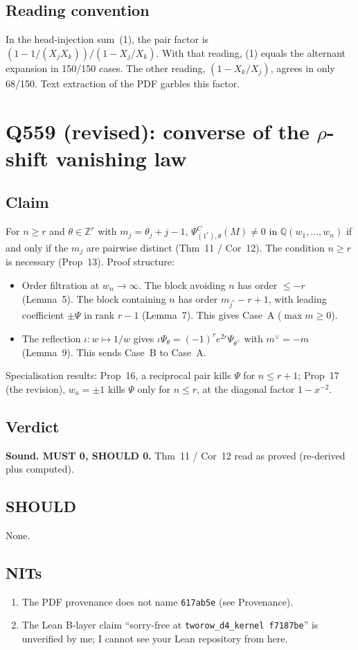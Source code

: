 \documentclass[11pt]{amsart}
\newcommand{\PsiC}{\Psi^{C}}
\newcommand{\Q}{\mathbb{Q}}
\newcommand{\Z}{\mathbb{Z}}
\begin{document}
\subsection*{Reading convention}
In the head-injection sum~(1), the pair factor is
$(1 - 1/(X_jX_k))/(1 - X_j/X_k)$. With that reading, (1) equals the alternant expansion in
150/150 cases. The other reading, $(1-X_k/X_j)$, agrees in only 68/150. Text extraction of the PDF
garbles this factor.

\section{Q559 (revised): converse of the $\rho$-shift vanishing law}

\subsection*{Claim}
For $n\ge r$ and $\theta\in\Z^r$ with $m_j=\theta_j+j-1$,
$\PsiC_{(1^r),\theta}(M)\neq0$ in $\Q(w_1,\dots,w_n)$ if and only if the $m_j$ are pairwise
distinct (Thm~11 / Cor~12). The condition $n\ge r$ is necessary (Prop~13). Proof structure:
\begin{itemize}[leftmargin=2em]
\item Order filtration at $w_n\to\infty$. The block avoiding $n$ has order $\le -r$ (Lemma~5). The
block containing $n$ has order $m_{j^*}-r+1$, with leading coefficient $\pm\Psi$ in rank $r-1$
(Lemma~7). This gives Case~A ($\max m\ge0$).
\item The reflection $\iota\colon w\mapsto 1/w$ gives
$\iota\Psi_\theta=(-1)^r e^{2r}\Psi_{\theta^\vee}$ with $m^\vee=-m$ (Lemma~9). This sends Case~B
to Case~A.
\end{itemize}
Specialisation results: Prop~16, a reciprocal pair kills $\Psi$ for $n\le r+1$; Prop~17 (the
revision), $w_a=\pm1$ kills $\Psi$ only for $n\le r$, at the diagonal factor $1-x^{-2}$.

\subsection*{Verdict}
\textbf{Sound. MUST 0, SHOULD 0.} Thm~11 / Cor~12 read as proved (re-derived plus computed).

\subsection*{SHOULD}
None.

\subsection*{NITs}
\begin{enumerate}[leftmargin=2em]
\item The PDF provenance does not name \texttt{617ab5e} (see Provenance).
\item The Lean B-layer claim ``sorry-free at \texttt{tworow\_d4\_kernel f7187be}'' is unverified by
me; I cannot see your Lean repository from here.
\end{enumerate}
\end{document}
